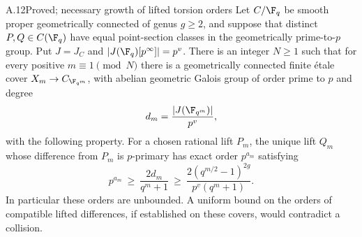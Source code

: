 \begin{claim}{A.12}{Proved; necessary growth of lifted torsion orders}
Let $C/\F_q$ be smooth proper geometrically connected of genus
$g\ge2$, and suppose that distinct $P,Q\in C(\F_q)$ have equal
point-section classes in the geometrically prime-to-$p$ group.
Put $J=J_C$ and $|J(\F_q)[p^\infty]|=p^v$. There is an integer
$N\ge1$ such that for every positive $m\equiv1\pmod N$ there is
a geometrically connected finite \'etale cover
$X_m\to C_{\F_{q^m}}$, with abelian geometric Galois group of
order prime to $p$ and degree
\[
 d_m=\frac{|J(\F_{q^m})|}{p^v},
\]
with the following property. For a chosen rational lift $P_m$,
the unique lift $Q_m$ whose difference from $P_m$ is
$p$-primary has exact order $p^{a_m}$ satisfying
\[
 p^{a_m}\ \ge\ \frac{2d_m}{q^m+1}
 \ \ge\ \frac{2(q^{m/2}-1)^{2g}}{p^v(q^m+1)}.                    \tag{A.8}
\]
In particular these orders are unbounded. A uniform bound on
the orders of compatible lifted differences, if established
on these covers, would contradict a collision.
\end{claim}
